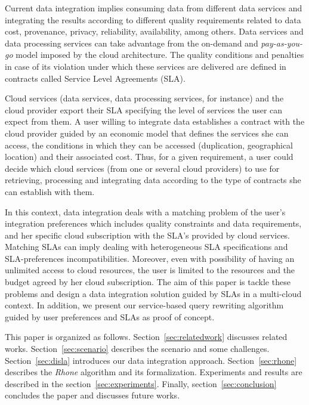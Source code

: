 Current data integration implies consuming data from different data services and integrating the results according to different quality requirements related to data cost, provenance, privacy, reliability, availability, among others. Data services and data processing services can take advantage from the on-demand and \textit{pay-as-you-go} model imposed by the cloud architecture. The quality conditions and penalties in case of its violation under which these services are delivered are defined in contracts called Service Level Agreements (SLA).

Cloud services (data services, data processing services, for instance) and the cloud provider export their SLA specifying the level of services the user can expect from them. A user willing to integrate data establishes a contract with the cloud provider guided by an economic model that defines the services she can access, the conditions in which they can be accessed (duplication, geographical location) and their associated cost. Thus, for a given requirement, a user could decide which cloud services (from one or several cloud providers) to use for retrieving, processing and integrating data according to the type of contracts she can establish with them.

In this context, data integration deals with a matching problem of the user's integration preferences which includes quality constraints and data requirements, and her specific cloud subscription with the SLA's provided by cloud services. Matching SLAs can imply dealing with heterogeneous SLA specifications and SLA-preferences incompatibilities. Moreover, even with possibility of having an unlimited access to cloud resources, the user is limited to the resources and the budget agreed by her cloud subscription. The aim of this paper is tackle these problems and design a data integration solution guided by SLAs in a multi-cloud context. In addition, we present our service-based query rewriting algorithm guided by user preferences and  SLAs as proof of concept.

This paper is organized as follows. 
Section~\ref{sec:relatedwork} discusses related works.
Section~\ref{sec:scenario} describes the scenario and some challenges.
Section~\ref{sec:disla} introduces our data integration approach. 
Section~\ref{sec:rhone} describes the \textit{Rhone} algorithm and its formalization. Experiments and results are described in the section~\ref{sec:experiments}. 
Finally, section~\ref{sec:conclusion} concludes the paper and discusses future works.

